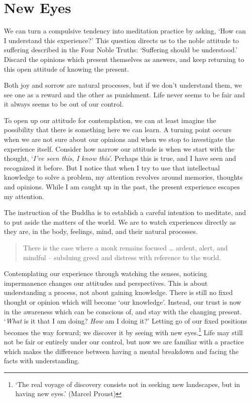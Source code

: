 \section{New Eyes}


We can turn a compulsive tendency into meditation practice by asking,
`How can I understand this experience?' This question directs us to the
noble attitude to suffering described in the Four Noble Truths:
`Suffering should be understood.' Discard the opinions which present
themselves as answers, and keep returning to this open attitude of
knowing the present.

Both joy and sorrow are natural processes, but if we don't understand
them, we see one as a reward and the other as punishment. Life never
seems to be fair and it always seems to be out of our control.

To open up our attitude for contemplation, we can at least imagine the
possibility that there is something here we can learn. A turning point
occurs when we are not sure about our opinions and when we stop to
investigate the experience itself. Consider how narrow our attitude is
when we start with the thought, `\emph{I've seen this, I know this}'.
Perhaps this is true, and I have seen and recognized it before. But I
notice that when I try to use that intellectual knowledge to solve a
problem, my attention revolves around memories, thoughts and opinions.
While I am caught up in the past, the present experience escapes my
attention.

The instruction of the Buddha is to establish a careful intention to
meditate, and to put aside the matters of the world. We are to watch
experiences directly as they are, in the body, feelings, mind, and their
natural processes.

\begin{quote}
There is the case where a monk remains focused \ldots{} ardent, alert,
and mindful -- subduing greed and distress with reference to the world.

\bigskip

\end{quote}

Contemplating our experience through watching the senses, noticing
impermanence changes our attitudes and perspectives. This is about
understanding a process, not about gaining knowledge. There is still no
fixed thought or opinion which will become `our knowledge'. Instead, our
trust is now in the awareness which can be conscious of, and stay with
the changing present. `\emph{What} is it that I am doing? \emph{How} am
I doing it?' Letting go of our fixed positions becomes the way forward;
we discover it by seeing with new eyes.\footnote{`The real voyage of
  discovery consists not in seeking new landscapes, but in having new
  eyes.' (Marcel Proust)} Life may still not be fair or entirely under
our control, but now we are familiar with a practice which makes the
difference between having a mental breakdown and facing the facts with
understanding.


